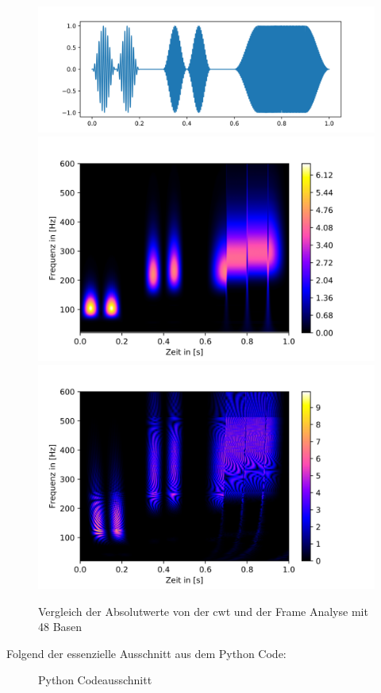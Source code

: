 \begin{figure}[!ht]
	\centering
	\includegraphics[width=\columnwidth]{papers/autotune/sections/frames/images/testsig.jpg}
	\label{fig:frame}
	\includegraphics[width=\linewidth]{papers/autotune/sections/frames/images/sincosmcwt.jpg}
	\label{fig:stft256}
	\includegraphics[width=\linewidth]{papers/autotune/sections/frames/images/sincosmdwt.jpg}   
	\label{fig:stft1024}                        
	\caption{Vergleich der Absolutwerte von der cwt und der Frame Analyse mit 48 Basen}
	\label{fig:STFT}
\end{figure}%




Folgend der essenzielle Ausschnitt aus dem Python Code:
\begin{figure}[!ht]
	\centering
	
	\caption{Python Codeausschnitt}
	\label{fig:python-code}
\end{figure}